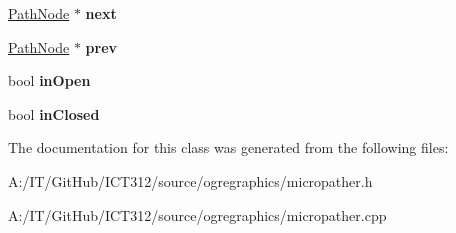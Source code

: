 \begin{DoxyCompactItemize}
\item 
\hypertarget{classmicropather_1_1_path_node_ad465acf855ae39c572626be523a5a05c}{\hyperlink{classmicropather_1_1_path_node}{Path\-Node} $\ast$ {\bfseries next}}\label{classmicropather_1_1_path_node_ad465acf855ae39c572626be523a5a05c}

\item 
\hypertarget{classmicropather_1_1_path_node_a645d41565557931d5a5e219880863697}{\hyperlink{classmicropather_1_1_path_node}{Path\-Node} $\ast$ {\bfseries prev}}\label{classmicropather_1_1_path_node_a645d41565557931d5a5e219880863697}

\item 
\hypertarget{classmicropather_1_1_path_node_a72d350121d020ceeb0a2c3faef8fc5ae}{bool {\bfseries in\-Open}}\label{classmicropather_1_1_path_node_a72d350121d020ceeb0a2c3faef8fc5ae}

\item 
\hypertarget{classmicropather_1_1_path_node_a1d55b5d7130d139156e5c44f42a6f63e}{bool {\bfseries in\-Closed}}\label{classmicropather_1_1_path_node_a1d55b5d7130d139156e5c44f42a6f63e}

\end{DoxyCompactItemize}


The documentation for this class was generated from the following files\-:\begin{DoxyCompactItemize}
\item 
A\-:/\-I\-T/\-Git\-Hub/\-I\-C\-T312/source/ogregraphics/micropather.\-h\item 
A\-:/\-I\-T/\-Git\-Hub/\-I\-C\-T312/source/ogregraphics/micropather.\-cpp\end{DoxyCompactItemize}
